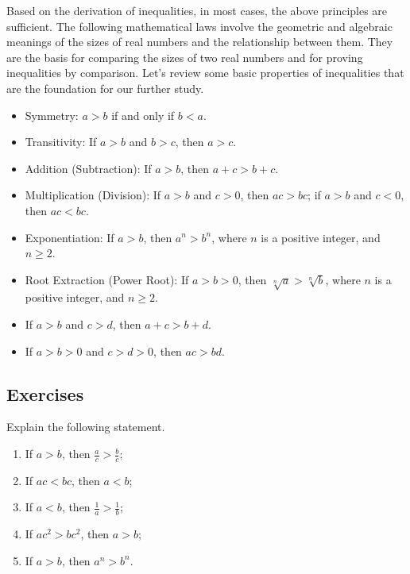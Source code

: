 Based on the derivation of inequalities, in most cases, the above principles are sufficient. The following mathematical laws involve the geometric and algebraic meanings of the sizes of real numbers and the relationship between them. They are the basis for comparing the sizes of two real numbers and for proving inequalities by comparison. Let's review some basic properties of inequalities that are the foundation for our further study.

\begin{itemize}
    \item Symmetry: \( a > b \) if and only if \( b < a \).
    \item Transitivity: If \( a > b \) and \( b > c \), then \( a > c \).
    \item Addition (Subtraction): If \( a > b \), then \( a + c > b + c \).
    \item Multiplication (Division): If \( a > b \) and \( c > 0 \), then \( ac > bc \); if \( a > b \) and \( c < 0 \), then \( ac < bc \).
    \item Exponentiation: If \( a > b \), then \( a^n > b^n \), where \( n \) is a positive integer, and \( n \geq 2 \).
    \item Root Extraction (Power Root): If \( a > b > 0 \), then \( \sqrt[n]{a} > \sqrt[n]{b} \), where \( n \) is a positive integer, and \( n \geq 2 \).
    \item If \( a > b \) and \( c > d \), then \( a + c > b + d \).
    \item If \( a > b > 0 \) and \( c > d > 0 \), then \( ac > bd \).
\end{itemize}
\subsection{Exercises}
\begin{exercise}
    Explain the following statement.
    \begin{enumerate}
        \item If \( a > b \), then \( \frac{a}{c} > \frac{b}{c} \);
        \item If \( ac < bc \), then \( a < b \);
        \item If \( a < b \), then \( \frac{1}{a} > \frac{1}{b} \);
        \item If \( ac^2 > bc^2 \), then \( a > b \);
        \item If \( a > b \), then \( a^n > b^n \).
    \end{enumerate}
\end{exercise}

